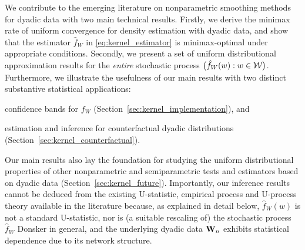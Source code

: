 We contribute to the emerging literature on nonparametric smoothing methods for
dyadic data with two main technical results. Firstly, we derive the minimax
rate of uniform convergence for density estimation with dyadic data, and show
that the estimator $\hat{f}_W$ in \eqref{eq:kernel_estimator} is
minimax-optimal under appropriate conditions. Secondly, we present a set of
uniform distributional approximation results for the \emph{entire} stochastic
process $\big(\hat{f}_W(w):w\in\mathcal{W}\big)$. Furthermore, we illustrate the
usefulness of our main results with two distinct substantive statistical
applications:
%
\begin{inlineroman}
  \item
    confidence bands for $f_W$ (Section~\ref{sec:kernel_implementation}), and
  \item
    estimation and inference for counterfactual
    dyadic distributions (Section~\ref{sec:kernel_counterfactual}).
\end{inlineroman}
%
Our main results also lay the foundation for studying the uniform
distributional properties of other nonparametric and semiparametric tests and
estimators based on dyadic data (Section~\ref{sec:kernel_future}). Importantly,
our
inference results cannot be deduced from the existing U-statistic, empirical
process and U-process theory available in the literature
\citep{van1996weak,gine2021mathematical} because, as explained in detail below,
$\hat{f}_W(w)$ is not a standard U-statistic, nor is
(a suitable rescaling of) the stochastic process
$\hat{f}_W$ Donsker in general, and the underlying dyadic data $\mathbf{W}_n$ exhibits
statistical dependence due to its network structure.


